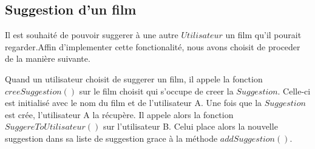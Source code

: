 \documentclass[10pt,a4paper]{article}
\begin{document}
	\subsection{Suggestion d'un film}
	
	Il est souhaité de pouvoir suggerer à une autre $Utilisateur$ un film qu'il pourait regarder.Affin d'implementer cette fonctionalité, nous avons choisit de proceder de la manière suivante.
	
	Quand un utilisateur choisit de suggerer un film, il appele la fonction $creeSuggestion()$ sur le film choisit qui s'occupe de creer la $Suggestion$. Celle-ci est initialisé avec le nom du film et de l'utilisateur A. Une fois que la $Suggestion$ est crée, l'utilisateur A la récupère. Il appele alors la fonction $SuggereToUtilisateur()$ sur l'utilisateur B. Celui place alors la nouvelle suggestion dans sa liste de suggestion grace à la méthode $addSuggestion()$.
	
\end{document}

